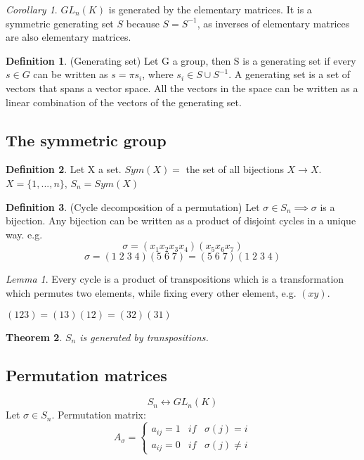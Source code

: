 \documentclass[12pt]{article}
\newtheorem{theorem}{Theorem}[section]
\theoremstyle{definition}
\newtheorem{definition}{Definition}[section]
\theoremstyle{remark}
\newtheorem{corollary}{Corollary}[theorem]
\newtheorem{lemma}[theorem]{Lemma}
\begin{document}
\begin{corollary}
    $GL_n(K)$ is generated by the elementary matrices. It is a symmetric generating set $S$ because $S =S^{-1}$, as 
    inverses of elementary matrices are also elementary matrices.
\end{corollary}
\begin{definition}(Generating set)
    Let G a group, then S is a generating set if every $s\in G$ can be written as $s = \pi s_i$, where $s_i \in S\cup S^{-1}$. 
    A generating set is a set of vectors that spans a vector space. All the vectors in the space can be written as a linear 
    combination of the vectors of the generating set. 
\end{definition}
\subsection{The symmetric group}
\begin{definition}
    Let X a set. 
    $Sym(X) =$ the set of all bijections $X\rightarrow X$. $X = \{ 1,..., n\}$, $S_n = Sym(X)$
\end{definition}
\begin{definition}(Cycle decomposition of a permutation)
    Let $\sigma \in S_n \implies \sigma$ is a bijection. Any bijection can be written as a product of disjoint cycles in a unique way. 
    e.g. $$\sigma = (x_1 x_2x_3x_4)(x_5x_6x_7)$$
    $$\sigma = (1\;2\;3\;4)(5\;6\;7) = (5\;6\;7) (1\;2\;3\;4)$$
\end{definition}
\begin{lemma}
    Every cycle is a product of transpositions which is a transformation which permutes two elements, while 
    fixing every other element, e.g. $(xy)$.
\end{lemma}
\begin{example}
    $(123) = (13)(12) = (32)(31)$
\end{example}
\begin{theorem}
    $S_n$ is generated by transpositions.
\end{theorem}
\subsection{Permutation matrices}
$$S_n \leftrightarrow GL_n(K)$$
Let $\sigma \in S_n$. Permutation matrix:
$$A_\sigma = \left\{ \begin{matrix}
    a_{ij}=1 & if & \sigma(j) = i \\ a_{ij}= 0 & if& \sigma(j) \neq i
\end{matrix}\right.$$
\end{document}
